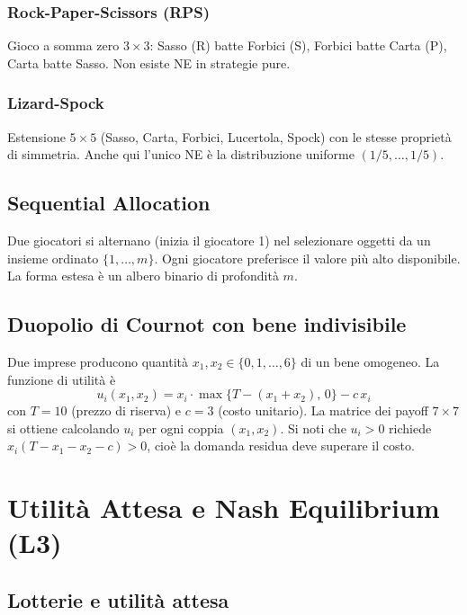 \documentclass[12pt,a4paper,twoside]{book}
\theoremstyle{plain}
\theoremstyle{definition}
\begin{document}
\subsection{Rock-Paper-Scissors (RPS)}

Gioco a somma zero $3\times 3$: Sasso (R) batte Forbici (S), Forbici batte Carta (P), Carta batte Sasso. Non esiste NE in strategie pure.

\subsection{Lizard-Spock}

Estensione $5\times 5$ (Sasso, Carta, Forbici, Lucertola, Spock) con le stesse proprietà di simmetria. Anche qui l'unico NE è la distribuzione uniforme $(1/5,\dots,1/5)$.

\section{Sequential Allocation}

Due giocatori si alternano (inizia il giocatore 1) nel selezionare oggetti da un insieme ordinato $\{1,\dots,m\}$. Ogni giocatore preferisce il valore più alto disponibile. La forma estesa è un albero binario di profondità $m$.

\section{Duopolio di Cournot con bene indivisibile}

Due imprese producono quantità $x_1,x_2\in\{0,1,\dots,6\}$ di un bene omogeneo. La funzione di utilità è
\[
  u_i(x_1,x_2) = x_i \cdot \max\{T-(x_1+x_2),\,0\} - c\,x_i
\]
con $T=10$ (prezzo di riserva) e $c=3$ (costo unitario). La matrice dei payoff $7\times 7$ si ottiene calcolando $u_i$ per ogni coppia $(x_1,x_2)$. Si noti che $u_i > 0$ richiede $x_i(T-x_1-x_2-c)>0$, cioè la domanda residua deve superare il costo.

\chapter{Utilità Attesa e Nash Equilibrium (L3)}

\section{Lotterie e utilità attesa}
\end{document}

